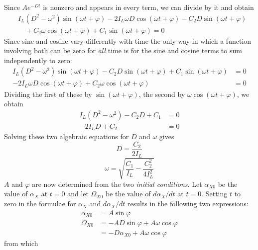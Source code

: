 Since $Ae^{-Dt}$ is nonzero and appears in every term, we can divide by it and
obtain
\begin{align*}
&I_L (D^{2} - \omega^{2})\sin(\omega t + \varphi)
  - 2 I_L \omega D\cos(\omega t + \varphi) - C_2 D\sin(\omega t + \varphi)\\
&\quad + C_2\omega\cos(\omega t + \varphi) + C_1\sin(\omega t + \varphi) = 0
\end{align*}
Since sine and cosine vary differently with time the only way in which a
function involving both can be zero for \emph{all} time is for the sine and
cosine terms to sum independently to zero:
\begin{align*}
I_L (D^{2} - \omega^{2})\sin(\omega t + \varphi) - C_2 D\sin(\omega t + \varphi)
  + C_1\sin(\omega t + \varphi) &= 0\\
-2 I_L \omega D\cos(\omega t + \varphi) + C_2\omega\cos(\omega t + \varphi) &= 0
\end{align*}
Dividing the first of these by $\sin(\omega t + \varphi)$, the second by
$\omega\cos(\omega t + \varphi)$, we obtain
\begin{align*}
I_L (D^{2} - \omega^{2}) - C_2 D + C_1 &= 0\\
-2 I_L D + C_2 &= 0
\end{align*}
Solving these two algebraic equations for $D$ and $\omega$ gives
\begin{equation}\label{ch2:eq:16}
D = \frac{C_2}{2 I_L}
\end{equation}
\begin{equation}\label{ch2:eq:17}
\omega = \sqrt{\frac{C_1}{I_L} - \frac{C_2^{2}}{4 I_L^{2}}}
\end{equation}
$A$ and $\varphi$ are now determined from the two \emph{initial conditions}.
Let $\alpha_{X0}$ be the value of $\alpha_X$ at $t = 0$ and let $\Omega_{X0}$
be the value of $d\alpha_X/dt$ at $t = 0$. Setting $t$ to zero in the formulae
for $\alpha_X$ and $d\alpha_X/dt$ results in the following two expressions:
\begin{align*}
\alpha_{X0} &= A\sin\varphi\\
\Omega_{X0} &= -AD\sin\varphi + A\omega\cos\varphi\\
&= -D\alpha_{X0} + A\omega\cos\varphi
\end{align*}
from which
